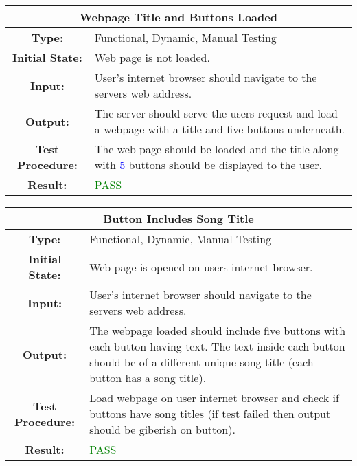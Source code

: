 \documentclass[12pt, titlepage]{article}
\newcommand{\numberOfSongs}{\textcolor{blue}{5 }}
\begin{document}
\begin{center}
\begin{table}[H]
\begin{tabularx}{\textwidth}{| c X |}
\hline
\multicolumn{2}{|c|}{\textbf{Webpage Title and Buttons Loaded}}\\
\hline
\textbf{Type: } & Functional, Dynamic, Manual Testing\\


\textbf{Initial State: } & Web page is not loaded.\\


\textbf{Input: } & User's internet browser should navigate to the servers web address.\\


\textbf{Output: } & The server should serve the users request and load a webpage with a title and five buttons underneath.\\


\textbf{Test Procedure:  } &   The web page should be loaded and the title along with \numberOfSongs buttons should be displayed to the user.\\


\textbf{Result: } & \textcolor{green}{PASS}\\
\hline
\end{tabularx}
\end{table}
\end{center}

\begin{center}
\begin{table}[H]
\begin{tabularx}{\textwidth}{| c X |}
\hline
\multicolumn{2}{|c|}{\textbf{Button Includes Song Title}}\\
\hline
\textbf{Type: } & Functional, Dynamic, Manual Testing\\


\textbf{Initial State: } & Web page is opened on users internet browser.\\


\textbf{Input: } & User's internet browser should navigate to the servers web address.\\


\textbf{Output: } & The webpage loaded should include five buttons with each button having text. The text inside each button should be of a different unique song title (each button has a song title).\\


\textbf{Test Procedure:  } & Load webpage on user internet browser and check if buttons have song titles (if test failed then output should be giberish on button).\\
\textbf{Result: } & \textcolor{green}{PASS}\\
\hline
\end{tabularx}
\end{table}
\end{center}
\end{document}
